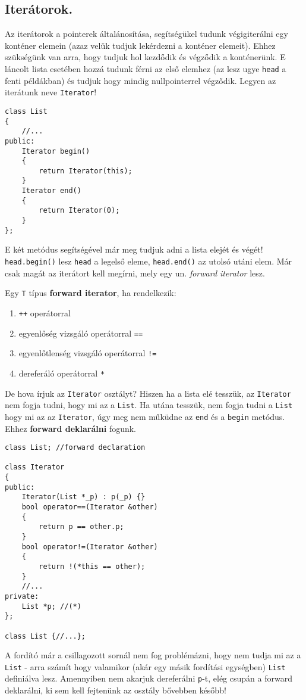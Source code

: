 \documentclass[a4paper,11.5pt]{article}
\begin{document}
	\subsection{Iterátorok.}
	Az iterátorok a pointerek általánosítása, segítségükel tudunk végigiterálni egy konténer elemein (azaz velük tudjuk lekérdezni a konténer elemeit). Ehhez szükségünk van arra, hogy tudjuk hol kezdődik és végződik a konténerünk. E láncolt lista esetében hozzá tudunk férni az első elemhez (az lesz ugye \texttt{head} a fenti példákban) és tudjuk hogy mindig nullpointerrel végződik. Legyen az iterátunk neve \texttt{Iterator}!
\begin{lstlisting}
class List
{
	//...
public:
	Iterator begin()
	{
		return Iterator(this);
	}
	Iterator end()
	{
		return Iterator(0);
	}
};
\end{lstlisting}
	E két metódus segítségével már meg tudjuk adni a lista elejét és végét! \texttt{head.begin()} lesz \texttt{head} a legelső eleme, \texttt{head.end()} az utolsó utáni elem. Már csak magát az iterátort kell megírni, mely egy un. \textit{forward iterator} lesz.
	\begin{definition}
		Egy \texttt{T} típus \textbf{forward iterator}, ha rendelkezik:
		\begin{enumerate}
			\item \texttt{++} operátorral
			\item egyenlőség vizsgáló operátorral \texttt{==}
			\item egyenlőtlenség vizsgáló operátorral \texttt{!=}
			\item dereferáló operátorral \texttt{*}
		\end{enumerate}
	\end{definition}
	De hova írjuk az \texttt{Iterator} osztályt? Hiszen ha a lista elé tesszük, az \texttt{Iterator} nem fogja tudni, hogy mi az a \texttt{List}. Ha utána tesszük, nem fogja tudni a \texttt{List} hogy mi az az \texttt{Iterator}, úgy meg nem műküdne az \texttt{end} és a \texttt{begin} metódus. Ehhez \textbf{forward deklarálni} fogunk.
	\begin{lstlisting}
class List; //forward declaration

class Iterator
{
public:
	Iterator(List *_p) : p(_p) {}
	bool operator==(Iterator &other)
	{
		return p == other.p;
	}
	bool operator!=(Iterator &other)
	{
		return !(*this == other);
	}
	//...
private:
	List *p; //(*)
};

class List {//...};
	\end{lstlisting}
	A fordító már a csillagozott sornál nem fog problémázni, hogy nem tudja mi az a \texttt{List} - arra számít hogy valamikor (akár egy másik fordítási egységben) \texttt{List} definiálva lesz. Amennyiben nem akarjuk dereferálni \texttt{p}-t, elég csupán a forward deklarálni, ki sem kell fejtenünk az osztály bővebben később!
	
\end{document}
